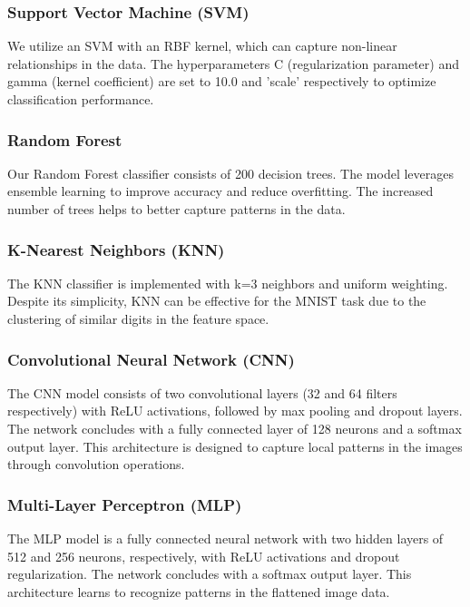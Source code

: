 \documentclass{article}
\begin{document}
\subsubsection{Support Vector Machine (SVM)}
We utilize an SVM with an RBF kernel, which can capture non-linear relationships in the data. The hyperparameters C (regularization parameter) and gamma (kernel coefficient) are set to 10.0 and 'scale' respectively to optimize classification performance.

\subsubsection{Random Forest}
Our Random Forest classifier consists of 200 decision trees. The model leverages ensemble learning to improve accuracy and reduce overfitting. The increased number of trees helps to better capture patterns in the data.

\subsubsection{K-Nearest Neighbors (KNN)}
The KNN classifier is implemented with k=3 neighbors and uniform weighting. Despite its simplicity, KNN can be effective for the MNIST task due to the clustering of similar digits in the feature space.

\subsubsection{Convolutional Neural Network (CNN)}
The CNN model consists of two convolutional layers (32 and 64 filters respectively) with ReLU activations, followed by max pooling and dropout layers. The network concludes with a fully connected layer of 128 neurons and a softmax output layer. This architecture is designed to capture local patterns in the images through convolution operations.

\subsubsection{Multi-Layer Perceptron (MLP)}
The MLP model is a fully connected neural network with two hidden layers of 512 and 256 neurons, respectively, with ReLU activations and dropout regularization. The network concludes with a softmax output layer. This architecture learns to recognize patterns in the flattened image data.
\end{document}
